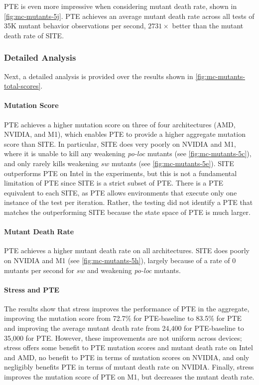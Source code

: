 PTE is even more impressive when considering mutant death rate, shown in \myfig\ref{fig:mc-mutants-5j}.  PTE achieves an average mutant death rate across all tests of 35K mutant behavior observations per second, $2731\times$ better than the mutant death rate of SITE.

\subsubsection{Detailed Analysis}
Next, a detailed analysis is provided over the results shown in \myfig\ref{fig:mc-mutants-total-scores}.

\paragraph{Mutation Score} PTE achieves a higher mutation score on three of four architectures (AMD, NVIDIA, and M1), which enables PTE to provide a higher aggregate mutation score than SITE. In particular, SITE does very poorly on NVIDIA and M1, where it is unable to kill any weakening \textit{po-loc} mutants (see \myfig\ref{fig:mc-mutants-5c}), and only rarely kills weakening $sw$ mutants (see \myfig\ref{fig:mc-mutants-5e}). SITE outperforms PTE on Intel in the experiments, but this is not a fundamental limitation of PTE since SITE is a strict subset of PTE. There is a PTE equivalent to each SITE, as PTE allows environments that execute only one instance of the test per iteration. Rather, the testing did not identify a PTE that matches the outperforming SITE because the state space of PTE is much larger.

\paragraph{Mutant Death Rate} PTE achieves a higher mutant death rate on all architectures. SITE does poorly on NVIDIA and M1 (see \myfig\ref{fig:mc-mutants-5h}), largely because of a rate of 0 mutants per second for $sw$ and weakening \textit{po-loc} mutants.

\paragraph{Stress and PTE} The results show that stress improves the performance of PTE in the aggregate, improving the mutation score from 72.7\% for PTE-baseline to 83.5\% for PTE and improving the average mutant death rate from 24,400 for PTE-baseline to 35,000 for PTE.  However, these improvements are not uniform across devices; stress offers some benefit to PTE mutation scores and mutant death rate on Intel and AMD, no benefit to PTE in terms of mutation scores on NVIDIA, and only negligibly benefits PTE in terms of mutant death rate on NVIDIA.  Finally, stress improves the mutation score of PTE on M1, but decreases the mutant death rate.

